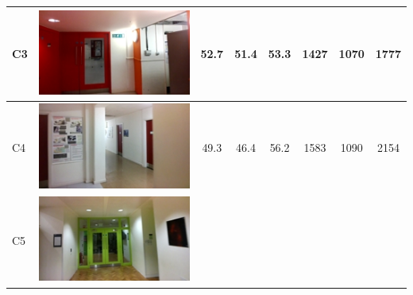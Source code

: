 \begin{table}[ht]
\begin{center}
\begin{tabular}{l c c c c c c c}
    C3       & \begin{minipage}{.2\textwidth}
      			\includegraphics[width=\linewidth]{./gfx/Chapter04/table/3.jpg}
			   \end{minipage}
			        & 52.7  & 51.4 & 53.3 & 1427         & 1070 & 1777 \\ \hline
    C4       & \begin{minipage}{.2\textwidth}
      			\includegraphics[width=\linewidth]{./gfx/Chapter04/table/4.jpg}
			   \end{minipage}
			        & 49.3  & 46.4 & 56.2 & 1583         & 1090 & 2154 \\ \hline
    C5       & \begin{minipage}{.2\textwidth}
      			\includegraphics[width=\linewidth]{./gfx/Chapter04/table/5.jpg}

\end{minipage}
\end{tabular}
\end{center}
\end{table}

